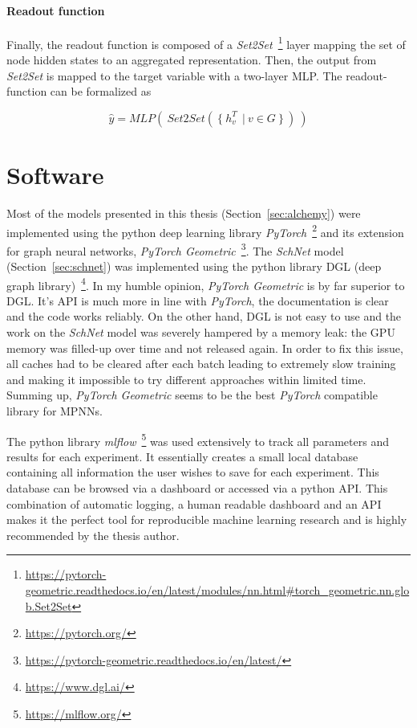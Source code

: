 \paragraph{Readout function} Finally, the readout function is composed of a \textit{Set2Set}~\footnote{\url{https://pytorch-geometric.readthedocs.io/en/latest/modules/nn.html\#torch_geometric.nn.glob.Set2Set}} layer mapping the set of node hidden states to an aggregated representation. Then, the output from \textit{Set2Set} is mapped to the target variable with a two-layer MLP. The readout-function can be formalized as

\begin{equation}
		\hat{y} = MLP(~Set2Set(~\{~h_v^T\ ~|~ v \in G~\}~)~)
\end{equation}

\section{Software}

Most of the models presented in this thesis (Section~\ref{sec:alchemy}) were implemented using the python deep learning library \textit{PyTorch}~\footnote{\url{https://pytorch.org/}} and its extension for graph neural networks, \textit{PyTorch Geometric}~\footnote{\url{https://pytorch-geometric.readthedocs.io/en/latest/}}. The \textit{SchNet} model (Section~\ref{sec:schnet}) was implemented using the python library DGL (deep graph library)~\footnote{\url{https://www.dgl.ai/}}. In my humble opinion, \textit{PyTorch Geometric} is by far superior to DGL. It's API is much more in line with \textit{PyTorch}, the documentation is clear and the code works reliably. On the other hand, DGL is not easy to use and the work on the \textit{SchNet} model was severely hampered by a memory leak: the GPU memory was filled-up over time and not released again. In order to fix this issue, all caches had to be cleared after each batch leading to extremely slow training and making it impossible to try different approaches within limited time. Summing up, \textit{PyTorch Geometric} seems to be the best \textit{PyTorch} compatible library for MPNNs.

The python library \textit{mlflow}~\footnote{\url{https://mlflow.org/}} was used extensively to track all parameters and results for each experiment. It essentially creates a small local database containing all information the user wishes to save for each experiment. This database can be browsed via a dashboard or accessed via a python API. This combination of automatic logging, a human readable dashboard and an API makes it the perfect tool for reproducible machine learning research and is highly recommended by the thesis author.

